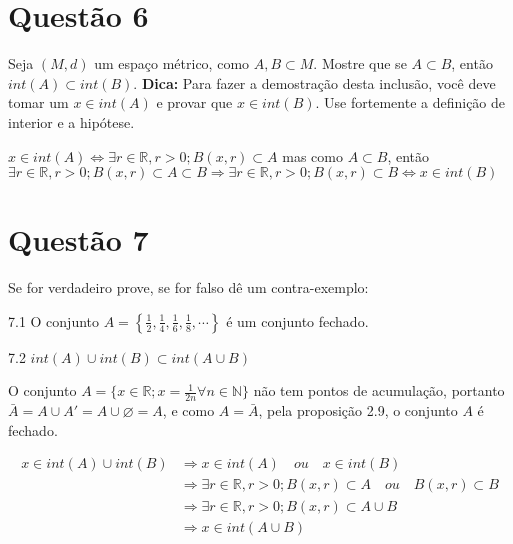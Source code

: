 \documentclass[10pt,a4paper]{article}
\begin{document}
	\section*{Questão 6}
	
	Seja $ (M, d) $ um espaço métrico, como $ A, B \subset M $. Mostre que se $ A \subset B $, então $ int(A) \subset int(B) $. \textbf{Dica:} Para fazer a demostração desta inclusão, você deve tomar um $ x \in int(A)$ e provar que $ x \in int(B) $. Use fortemente a definição de interior e a hipótese.
	
	$ x \in int(A) \Leftrightarrow \exists r \in \mathbb{R},  r > 0; B(x, r) \subset A $ mas como $ A \subset B $, então $ \exists r \in \mathbb{R},  r > 0; B(x, r) \subset A \subset B \Rightarrow \exists r \in \mathbb{R},  r > 0; B(x, r)\subset B \Leftrightarrow x \in int(B) $
	
	\section*{Questão 7}
	
	Se for verdadeiro prove, se for falso dê um contra-exemplo:
	
	7.1 O conjunto $A = \left\{ \frac{1}{2}, \frac{1}{4}, \frac{1}{6}, \frac{1}{8}, \cdots \right\}$ é um conjunto fechado.
	
	7.2 $ int(A) \cup int(B) \subset int(A \cup B) $
	
	O conjunto $A = \{x \in \mathbb{R}; x = \frac{1}{2n} \forall n \in \mathbb{N} \}$ não tem pontos de acumulação, portanto $ \bar{A} = A \cup A' = A \cup \varnothing = A $, e como $A = \bar{A}$, pela proposição 2.9, o conjunto $A$ é fechado.
	
	\begin{equation}
		\begin{aligned}
		x \in int(A) \cup int(B) &\Rightarrow x \in int (A)\quad ou \quad x \in int(B) \\
		&\Rightarrow \exists r \in \mathbb{R}, r > 0; B(x, r) \subset A \quad ou \quad B(x, r) \subset B \\
		&\Rightarrow \exists r \in \mathbb{R}, r > 0; B(x, r) \subset A \cup B \\
		&\Rightarrow x \in int(A \cup B)
		\end{aligned}
	\end{equation}
	
	
\end{document}
